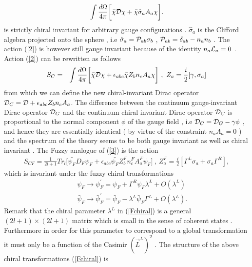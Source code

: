 \documentclass[a4paper,10pt]{article}
\begin{document}
\begin{eqnarray}
\int \frac{d{\Omega}}{4{\pi}}\bigg[\bar{{\chi}}{\cal D}
{\chi}+\bar{{\chi}}\hat{\sigma}_a{A}_a{{\chi}}\bigg].\label{2}
\end{eqnarray}
is strictly chiral invariant for arbitrary gauge configurations .
$\hat{\sigma}_a$ is the Clifford algebra projected onto the sphere
, i.e $\hat{\sigma}_a={\cal P}_{ab}{\sigma}_{b}$ , ${\cal
P}_{ab}={\delta}_{ab}-n_an_b$ . The action (\ref{2}) is however
still gauge invariant because of the identity $n_a{\cal L}_a=0$ .
Action (\ref{2}) can be rewritten as follows
\begin{eqnarray}
S_{C}&=&\int \frac{d{\Omega}}{4{\pi}}\bigg[\bar{{\chi}}{\cal D}
{\chi}+{\epsilon}_{abc}\bar{{\chi}}Z_bn_c{A}_a{{\chi}}\bigg]~,~Z_a=\frac{i}{2}[{\gamma},{\sigma}_a]\label{3}
\end{eqnarray}
from which we can define the new chiral-invariant Dirac operator
${\cal D}_C={\cal D}+{\epsilon}_{abc}Z_bn_cA_a$. The difference
between the continuum gauge-invariant Dirac operator ${\cal D}_G$
and the continuum chiral-invariant Dirac operator ${\cal D}_C$ is
proportional to the normal component ${\phi}$ of the gauge field
, i.e ${\cal D}_{C}={\cal D}_G-{\gamma}{\phi}$ , and hence they
are essentially identical ( by virtue of the constraint $n_aA_a=0$
) and the spectrum of the theory seems to be both gauge invariant
as well as chiral invariant . The Fuzzy analogue of (\ref{3}) is
the action
\begin{eqnarray}
S_{CF} =\frac{1}{2l+1}Tr_{l}
\bigg[\bar{{\psi}_F}D_F{\psi}_F+{\epsilon}_{abc}\bar{{\psi}_F}Z_b^Fn^F_c{A}_{a}^F{{\psi}_F}
\bigg]~,~Z_a^F=\frac{i}{2}[{\Gamma}^L{\sigma}_a+{\sigma}_a{\Gamma}^R],\label{3F}
\end{eqnarray}
which is invariant under the fuzzy chiral transformations
\begin{eqnarray}
&&{\psi}_F{\longrightarrow}{\psi}_F^{'}={\psi}_F+{\Gamma}^R{\psi}_F{\lambda}^L+O({\lambda}^{L})\nonumber\\
&&\bar{\psi}_F{\longrightarrow}\bar{\psi}_F^{'}=\bar{\psi}_F-{\lambda}^L\bar{\psi}_F{\Gamma}^L+O({\lambda}^L).\label{Fchiral}
\end{eqnarray}
Remark that the chiral parameter ${\lambda}^L$ in (\ref{Fchiral})
is a general $(2l+1){\times}(2l+1)$ matrix which is small in the
sense of coherent states \cite{lee,ref21} . Furthermore in order
for this parameter to correspond to a global transformation it
must only be a function of the Casimir $(\vec{L}^{L})^2$ . The
structure of the above chiral transformations (\ref{Fchiral}) is
\end{document}
